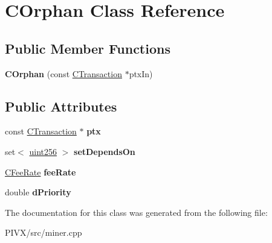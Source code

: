 \hypertarget{class_c_orphan}{}\section{C\+Orphan Class Reference}
\label{class_c_orphan}
\subsection*{Public Member Functions}
\begin{DoxyCompactItemize}
\item 
\mbox{\label{class_c_orphan_a7950b07537159af9de79cdc60d836d46}} 
{\bfseries C\+Orphan} (const \mbox{\hyperlink{class_c_transaction}{C\+Transaction}} $\ast$ptx\+In)
\end{DoxyCompactItemize}
\subsection*{Public Attributes}
\begin{DoxyCompactItemize}
\item 
\mbox{\label{class_c_orphan_a6bc886fad47f30a4c1cc80dc764e4095}} 
const \mbox{\hyperlink{class_c_transaction}{C\+Transaction}} $\ast$ {\bfseries ptx}
\item 
\mbox{\label{class_c_orphan_a1b19183565d42c20ded09a2cc787fc50}} 
set$<$ \mbox{\hyperlink{classuint256}{uint256}} $>$ {\bfseries set\+Depends\+On}
\item 
\mbox{\label{class_c_orphan_a2aab629162d580085082408643149e92}} 
\mbox{\hyperlink{class_c_fee_rate}{C\+Fee\+Rate}} {\bfseries fee\+Rate}
\item 
\mbox{\label{class_c_orphan_a899f7928b6d4e9206ce04d5b2953da33}} 
double {\bfseries d\+Priority}
\end{DoxyCompactItemize}


The documentation for this class was generated from the following file\+:\begin{DoxyCompactItemize}
\item 
P\+I\+V\+X/src/miner.\+cpp\end{DoxyCompactItemize}
